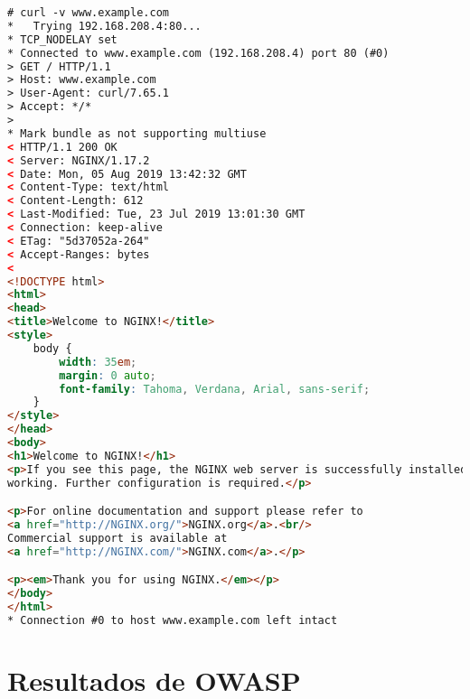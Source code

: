 \begin{lstlisting}[language=html, label={lst:nginx_welcome_message},caption={Mensaje de bienvenida de NGINX}]
# curl -v www.example.com
*   Trying 192.168.208.4:80...
* TCP_NODELAY set
* Connected to www.example.com (192.168.208.4) port 80 (#0)
> GET / HTTP/1.1
> Host: www.example.com
> User-Agent: curl/7.65.1
> Accept: */*
>
* Mark bundle as not supporting multiuse
< HTTP/1.1 200 OK
< Server: NGINX/1.17.2
< Date: Mon, 05 Aug 2019 13:42:32 GMT
< Content-Type: text/html
< Content-Length: 612
< Last-Modified: Tue, 23 Jul 2019 13:01:30 GMT
< Connection: keep-alive
< ETag: "5d37052a-264"
< Accept-Ranges: bytes
<
<!DOCTYPE html>
<html>
<head>
<title>Welcome to NGINX!</title>
<style>
    body {
        width: 35em;
        margin: 0 auto;
        font-family: Tahoma, Verdana, Arial, sans-serif;
    }
</style>
</head>
<body>
<h1>Welcome to NGINX!</h1>
<p>If you see this page, the NGINX web server is successfully installed and
working. Further configuration is required.</p>

<p>For online documentation and support please refer to
<a href="http://NGINX.org/">NGINX.org</a>.<br/>
Commercial support is available at
<a href="http://NGINX.com/">NGINX.com</a>.</p>

<p><em>Thank you for using NGINX.</em></p>
</body>
</html>
* Connection #0 to host www.example.com left intact
\end{lstlisting}

\section{Resultados de OWASP}

